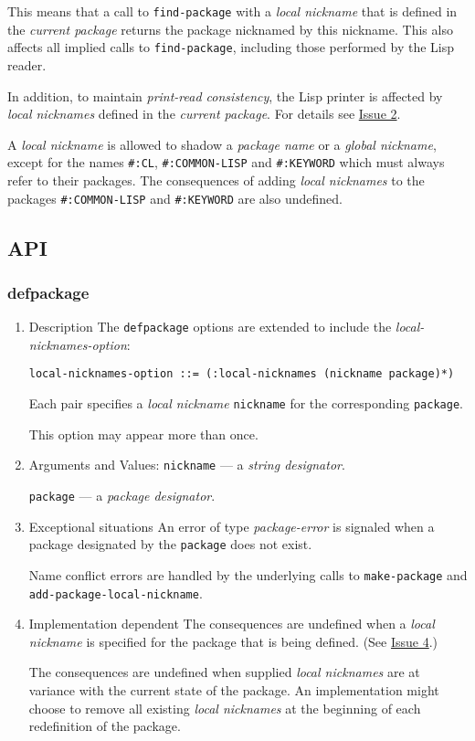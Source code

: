\documentclass[11pt]{article}
\begin{document}
This means that a call to \texttt{find-package} with a \emph{local nickname} that is defined in
the \emph{current package} returns the package nicknamed by this nickname. This also
affects all implied calls to \texttt{find-package}, including those performed by the Lisp
reader.

In addition, to maintain \emph{print-read consistency}, the Lisp printer is affected by
\emph{local nicknames} defined in the \emph{current package}.  For details see \hyperref[sec:org260b361]{Issue 2}.

A \emph{local nickname} is allowed to shadow a \emph{package name} or a \emph{global nickname},
except for the names \texttt{\#:CL}, \texttt{\#:COMMON-LISP} and \texttt{\#:KEYWORD} which must always
refer to their packages. The consequences of adding \emph{local nicknames} to the
packages \texttt{\#:COMMON-LISP} and \texttt{\#:KEYWORD} are also undefined.
\subsection{API}
\label{sec:orgaecdb27}
\subsubsection{defpackage}
\label{sec:orge74469a}
\begin{enumerate}
\item Description
\label{sec:orga8e8291}
The \texttt{defpackage} options are extended to include the \emph{local-nicknames-option}:
\begin{verbatim}
local-nicknames-option ::= (:local-nicknames (nickname package)*)
\end{verbatim}


Each pair specifies a \emph{local nickname} \texttt{nickname} for the corresponding \texttt{package}.

This option may appear more than once.
\item Arguments and Values:
\label{sec:orgd02efe8}
\texttt{nickname} --- a \emph{string designator}.

\texttt{package} --- a \emph{package designator}.
\item Exceptional situations
\label{sec:org2a09caf}
An error of type \emph{package-error} is signaled when a package designated by the
\texttt{package} does not exist.

Name conflict errors are handled by the underlying calls to
\texttt{make-package} and \texttt{add-package-local-nickname}.
\item Implementation dependent
\label{sec:org0ab63ba}
The consequences are undefined when a \emph{local nickname} is specified for the
package that is being defined. (See \hyperref[sec:org43f3224]{Issue 4}.)

The consequences are undefined when supplied \emph{local nicknames} are at variance
with the current state of the package. An implementation might choose to remove
all existing \emph{local nicknames} at the beginning of each redefinition of the
package.
\end{enumerate}
\end{document}
